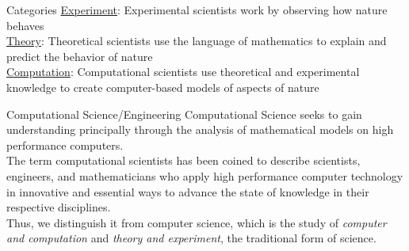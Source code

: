 \documentclass[xcolor=x11names,compress]{beamer}
\renewcommand{\(}{\begin{columns}}
\renewcommand{\)}{\end{columns}}
\newcommand{\<}[1]{\begin{column}{#1}}
\renewcommand{\>}{\end{column}}
\begin{document}
\begin{frame}{Categories}
\underline{Experiment}: Experimental scientists work by \alert{observing how} nature behaves\\
\vspace*{0.25 in}
\underline{Theory}: Theoretical scientists use the language of mathematics to \alert{explain and predict} the behavior of nature\\
\vspace*{0.25 in}
\underline{Computation}: Computational scientists use theoretical and experimental knowledge to \alert{create computer-based models} of aspects of nature
\end{frame}

\begin{frame}{Computational Science/Engineering}
\textcolor{dgreen}{Computational Science} seeks to gain understanding principally through the analysis of mathematical models on high performance computers.\\
\vspace*{0.25 in}
The term \textcolor{dgreen}{computational scientists} has been coined to describe scientists, engineers, and mathematicians who apply high performance computer technology in innovative and essential ways to advance the state of knowledge in their respective disciplines.\\
\vspace*{0.25 in}
Thus, we distinguish it from \textcolor{dgreen}{computer science}, which is the study of \emph{computer and computation} and \emph{theory and experiment}, the traditional form of science. 
\end{frame}

\end{document}
